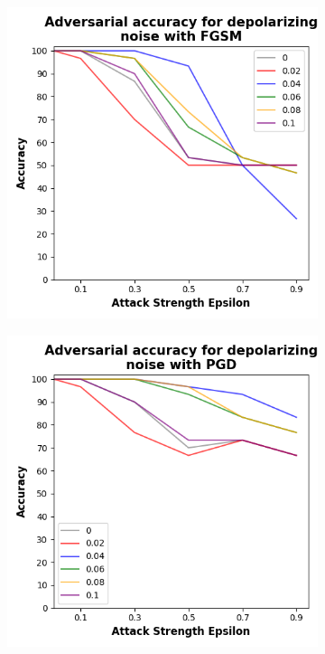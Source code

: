 \begin{figure}[!h]
  \centering

  \begin{subfigure}{0.45\textwidth}
      \includegraphics[width=\linewidth]{figures/evaluation_results/iris/pqc/figures/depolarizing-fgsm.png}
      \label{fig:iris11}
  \end{subfigure} \qquad
  \begin{subfigure}{0.45\textwidth}
      \includegraphics[width=\linewidth]{figures/evaluation_results/iris/pqc/figures/depolarizing-pgd.png}

\end{subfigure}
\end{figure}
